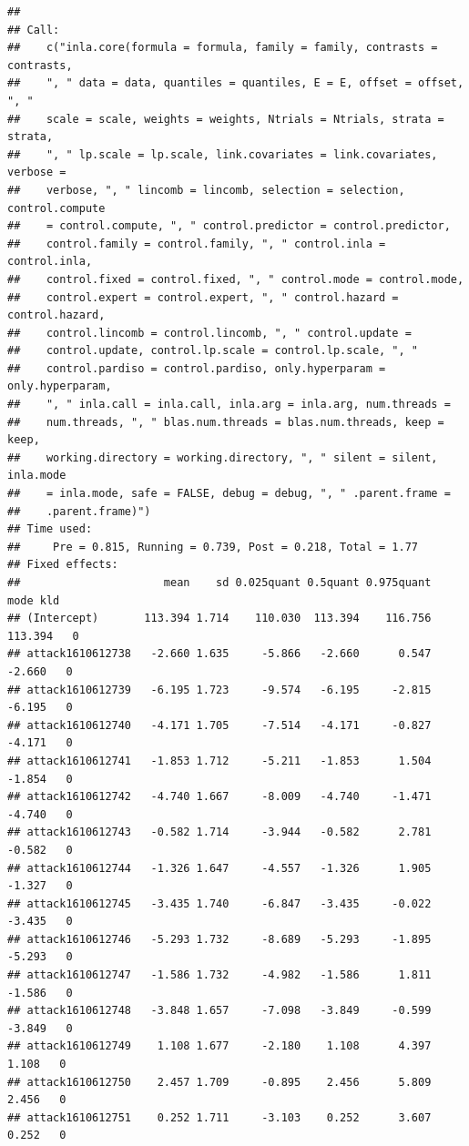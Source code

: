 \documentclass[
]{article}
\begin{document}
\begin{verbatim}
## 
## Call:
##    c("inla.core(formula = formula, family = family, contrasts = contrasts, 
##    ", " data = data, quantiles = quantiles, E = E, offset = offset, ", " 
##    scale = scale, weights = weights, Ntrials = Ntrials, strata = strata, 
##    ", " lp.scale = lp.scale, link.covariates = link.covariates, verbose = 
##    verbose, ", " lincomb = lincomb, selection = selection, control.compute 
##    = control.compute, ", " control.predictor = control.predictor, 
##    control.family = control.family, ", " control.inla = control.inla, 
##    control.fixed = control.fixed, ", " control.mode = control.mode, 
##    control.expert = control.expert, ", " control.hazard = control.hazard, 
##    control.lincomb = control.lincomb, ", " control.update = 
##    control.update, control.lp.scale = control.lp.scale, ", " 
##    control.pardiso = control.pardiso, only.hyperparam = only.hyperparam, 
##    ", " inla.call = inla.call, inla.arg = inla.arg, num.threads = 
##    num.threads, ", " blas.num.threads = blas.num.threads, keep = keep, 
##    working.directory = working.directory, ", " silent = silent, inla.mode 
##    = inla.mode, safe = FALSE, debug = debug, ", " .parent.frame = 
##    .parent.frame)") 
## Time used:
##     Pre = 0.815, Running = 0.739, Post = 0.218, Total = 1.77 
## Fixed effects:
##                      mean    sd 0.025quant 0.5quant 0.975quant    mode kld
## (Intercept)       113.394 1.714    110.030  113.394    116.756 113.394   0
## attack1610612738   -2.660 1.635     -5.866   -2.660      0.547  -2.660   0
## attack1610612739   -6.195 1.723     -9.574   -6.195     -2.815  -6.195   0
## attack1610612740   -4.171 1.705     -7.514   -4.171     -0.827  -4.171   0
## attack1610612741   -1.853 1.712     -5.211   -1.853      1.504  -1.854   0
## attack1610612742   -4.740 1.667     -8.009   -4.740     -1.471  -4.740   0
## attack1610612743   -0.582 1.714     -3.944   -0.582      2.781  -0.582   0
## attack1610612744   -1.326 1.647     -4.557   -1.326      1.905  -1.327   0
## attack1610612745   -3.435 1.740     -6.847   -3.435     -0.022  -3.435   0
## attack1610612746   -5.293 1.732     -8.689   -5.293     -1.895  -5.293   0
## attack1610612747   -1.586 1.732     -4.982   -1.586      1.811  -1.586   0
## attack1610612748   -3.848 1.657     -7.098   -3.849     -0.599  -3.849   0
## attack1610612749    1.108 1.677     -2.180    1.108      4.397   1.108   0
## attack1610612750    2.457 1.709     -0.895    2.456      5.809   2.456   0
## attack1610612751    0.252 1.711     -3.103    0.252      3.607   0.252   0

\end{verbatim}
\end{document}
